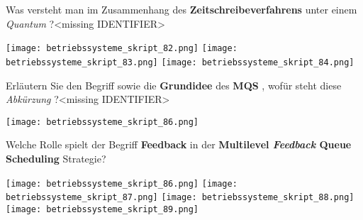 \documentclass{article}
\begin{document}
\begin{tcolorbox}[colback=white!10!white,colframe=lightgray!75!black,
  savelowerto=\jobname_ex.tex,breakable,enhanced,lines before break=40]

\begin{center}
Was versteht man im Zusammenhang des 
\textbf{Zeitschreibeverfahrens
} unter einem 
\textit{Quantum
}?<missing IDENTIFIER>

\end{center}

\tcblower

\justifying
\texttt{[image: betriebssysteme\_skript\_82.png]}
\texttt{[image: betriebssysteme\_skript\_83.png]}
\texttt{[image: betriebssysteme\_skript\_84.png]}

\end{tcolorbox}
\begin{tcolorbox}[colback=white!10!white,colframe=lightgray!75!black,
  savelowerto=\jobname_ex.tex,breakable,enhanced,lines before break=40]

\begin{center}
Erläutern Sie den Begriff sowie die 
\textbf{Grundidee
} des 
\textbf{MQS
}, wofür steht diese 
\textit{Abkürzung
}?<missing IDENTIFIER>

\end{center}

\tcblower

\justifying
\texttt{[image: betriebssysteme\_skript\_86.png]}

\end{tcolorbox}
\begin{tcolorbox}[colback=white!10!white,colframe=lightgray!75!black,
  savelowerto=\jobname_ex.tex,breakable,enhanced,lines before break=40]

\begin{center}
Welche Rolle spielt der Begriff 
\textbf{Feedback
} in der 
\textbf{Multilevel 
\textit{Feedback
} Queue Scheduling
} Strategie?

\end{center}

\tcblower

\justifying
\texttt{[image: betriebssysteme\_skript\_86.png]}
\texttt{[image: betriebssysteme\_skript\_87.png]}
\texttt{[image: betriebssysteme\_skript\_88.png]}
\texttt{[image: betriebssysteme\_skript\_89.png]}

\end{tcolorbox}
\end{document}
